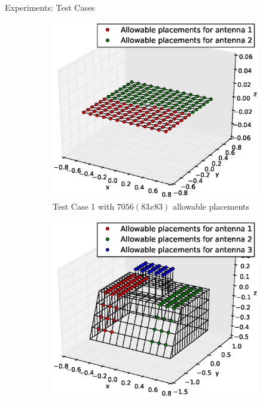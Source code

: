 \documentclass{beamer}
\begin{document}
        \begin{frame}{Experiments: Test Cases}
            \begin{figure}
                \centering
                \begin{subfigure}{.5\columnwidth}
                    \includegraphics[width=\columnwidth,height=\columnwidth]{../paper/FIG/tc_1_figure}%
                    \caption{\tiny Test Case 1 with $7056 (83x83)$ allowable placements}%
                    \label{fig:tc1_figure}%
                \end{subfigure}\hfill%
                \begin{subfigure}{.5\columnwidth}
                    \includegraphics[width=\columnwidth, height=\columnwidth]{../paper/FIG/tc_2_figure}%

\end{subfigure}
\end{figure}
\end{frame}
\end{document}
